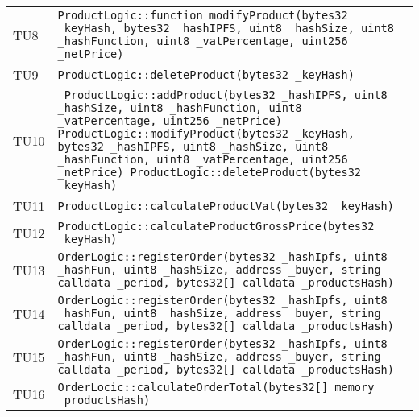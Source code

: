 \begin{longtable}{ >{\centering}p{} >{}p{}}
			\hypertarget{TU8}{TU8} & \texttt{ProductLogic::function 
			modifyProduct(bytes32 \_keyHash, bytes32 \_hashIPFS, uint8 
			\_hashSize, uint8 \_hashFunction, uint8 \_vatPercentage, uint256 
			\_netPrice)}\\
			
			\hypertarget{TU9}{TU9} & 
			\texttt{ProductLogic::deleteProduct(bytes32 \_keyHash)}\\
			
			\hypertarget{TU10}{TU10} & \texttt{ 
			ProductLogic::addProduct(bytes32 \_hashIPFS, uint8 \_hashSize, 
			uint8 \_hashFunction, uint8 \_vatPercentage, uint256 
			\_netPrice) \newline \newline
			ProductLogic::modifyProduct(bytes32 \_keyHash, 
			bytes32 \_hashIPFS, uint8 \_hashSize, uint8 \_hashFunction, uint8 
			\_vatPercentage, uint256 \_netPrice)\newline \newline
			ProductLogic::deleteProduct(bytes32 \_keyHash)}\\
			
			\hypertarget{TU11}{TU11} & 
			\texttt{ProductLogic::calculateProductVat(bytes32 \_keyHash)}\\
			
			\hypertarget{TU12}{TU12} & 
			\texttt{ProductLogic::calculateProductGrossPrice(bytes32 
			\_keyHash)}\\
		
			\hypertarget{TU13}{TU13} & 
			\texttt{OrderLogic::registerOrder(bytes32 \_hashIpfs, uint8 
			\_hashFun, uint8 \_hashSize, address \_buyer, string calldata 
			\_period, bytes32[] calldata \_productsHash)}\\
		
			\hypertarget{TU14}{TU14} & 
			\texttt{OrderLogic::registerOrder(bytes32 \_hashIpfs, uint8 
				\_hashFun, uint8 \_hashSize, address \_buyer, string calldata 
				\_period, bytes32[] calldata \_productsHash)}\\
			
			\hypertarget{TU15}{TU15} & 
			\texttt{OrderLogic::registerOrder(bytes32 \_hashIpfs, uint8 
				\_hashFun, uint8 \_hashSize, address \_buyer, string calldata 
				\_period, bytes32[] calldata \_productsHash)}\\
			
			\hypertarget{TU16}{TU16} & 
			\texttt{OrderLocic::calculateOrderTotal(bytes32[] memory 
			\_productsHash)}\\
			

\end{longtable}
